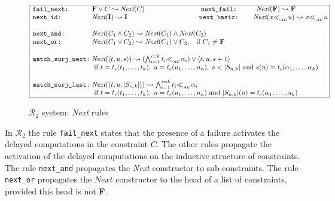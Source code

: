 \documentclass[submission,copyright,creativecommons]{eptcs}
\newcommand \matchth[3]{#1 {\ll}_{{ }_{#3}} {#2}}
\newcommand \matchAC[2]{\matchth{#1}{#2}{AC}}
\newcommand \trip[1]{\langle #1 \rangle}
\numberwithin{subcase}{case}
\begin{document}
\begin{figure}[hbt!]
\begin{align*}
\begin{array}{@{}|l@{\;}l@{}l@{\;}|@{}}
\hline
 \texttt{fail\_next:} &\textbf{F} \lor C \leadsto \textit{Next}({C}) \hspace{2.9cm}
\texttt{next\_fail:} \hspace{1cm} \textit{Next}(\textbf{F}) \leadsto \textbf{F} &\\
\texttt{next\_id:}&  \textit{Next}(\textbf{I}) \leadsto \textbf{I} \hspace{3.7cm}
 \texttt{next\_basic:} \hspace{0.75cm}  \textit{Next}(\matchAC{x}{u}) \leadsto \matchAC{x}{u} & \\
&& \\
\texttt{next\_and:}&  \textit{Next}(C_1 \land C_2) \leadsto 
  \textit{Next}(C_1) \land \textit{Next}(C_2)  &\\
\texttt{next\_or:}& \textit{Next}(C_1 \lor C_2) \leadsto  \textit{Next}(C_1)\lor C_2, 
   \;\; \textrm{ if } C_1 \neq \textbf{F}  &\\
&& \\
\texttt{match\_surj\_next:}& \textit{Next}(\trip{t,u,{s}}) \leadsto
(\bigwedge_{i=1}^{i=k}\matchAC{t_i}{\alpha_i}) \lor {\trip{t,u,{s}+1}} &  \\
 & \textrm{ if }  t=t_{\epsilon}(t_1,\ldots,t_k), \;
 u=t_{\epsilon}(u_1,\ldots,u_n), \; {s} < |S_{n,k}| \textrm{ and } 
 {s}(u)=t_{\epsilon}(\alpha_1,\ldots,\alpha_k)    &\\ 
&&\\
\texttt{match\_surj\_last:}& \textit{Next}(\trip{t,u,|S_{n,k}|}) 
\leadsto \bigwedge_{i=1}^{i=k}\matchAC{t_i}{\alpha_i} &\\
 & \textrm{ if } 
     t=t_{\epsilon}(t_1,\ldots,t_k), \; 
     u=t_{\epsilon}(u_1,\ldots,u_n)  \textrm{ and }
     |S_{n,k}|(u)=t_{\epsilon}(\alpha_1,\ldots,\alpha_k)&\\
\hline 
\end{array}
\end{align*}
\caption{$\mathcal{R}_2$ system: \textit{Next} rules \label{Next}}
\end{figure}
In $\mathcal{R}_2$ the rule \texttt{fail\_next} states that the presence of a
failure activates the delayed computations in the constraint $C$. The other rules
propagate the activation of the delayed computations on the inductive structure
of constraints. The rule \texttt{next\_and}
 propagates the \textit{Next} constructor to sub-constraints. The rule
 \texttt{next\_or} propagates the $\textit{Next}$ constructor to the
 head of a list of constraints, provided this head is not \textbf{F}.
\end{document}
